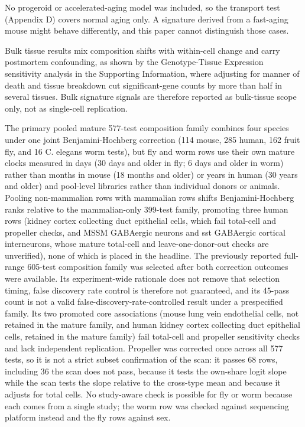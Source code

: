 \documentclass[11pt]{article}
\begin{document}
No progeroid or accelerated-aging model was included, so the transport test (Appendix D) covers normal aging only. A signature derived from a fast-aging mouse might behave differently, and this paper cannot distinguish those cases.

Bulk tissue results mix composition shifts with within-cell change and carry postmortem confounding, as shown by the Genotype-Tissue Expression sensitivity analysis in the Supporting Information, where adjusting for manner of death and tissue breakdown cut significant-gene counts by more than half in several tissues. Bulk signature signals are therefore reported as bulk-tissue scope only, not as single-cell replication.

The primary pooled mature 577-test composition family combines four species under one joint Benjamini-Hochberg correction (114 mouse, 285 human, 162 fruit fly, and 16 C. elegans worm tests), but fly and worm rows use their own mature clocks measured in days (30 days and older in fly; 6 days and older in worm) rather than months in mouse (18 months and older) or years in human (30 years and older) and pool-level libraries rather than individual donors or animals. Pooling non-mammalian rows with mammalian rows shifts Benjamini-Hochberg ranks relative to the mammalian-only 399-test family, promoting three human rows (kidney cortex collecting duct epithelial cells, which fail total-cell and propeller checks, and MSSM GABAergic neurons and sst GABAergic cortical interneurons, whose mature total-cell and leave-one-donor-out checks are unverified), none of which is placed in the headline. The previously reported full-range 605-test composition family was selected after both correction outcomes were available. Its experiment-wide rationale does not remove that selection timing, false discovery rate control is therefore not guaranteed, and its 45-pass count is not a valid false-discovery-rate-controlled result under a prespecified family. Its two promoted core associations (mouse lung vein endothelial cells, not retained in the mature family, and human kidney cortex collecting duct epithelial cells, retained in the mature family) fail total-cell and propeller sensitivity checks and lack independent replication. Propeller was corrected once across all 577 tests, so it is not a strict subset confirmation of the scan: it passes 68 rows, including 36 the scan does not pass, because it tests the own-share logit slope while the scan tests the slope relative to the cross-type mean and because it adjusts for total cells. No study-aware check is possible for fly or worm because each comes from a single study; the worm row was checked against sequencing platform instead and the fly rows against sex.
\end{document}
